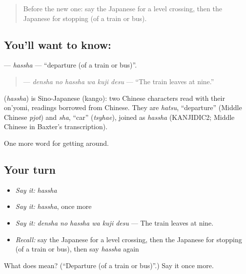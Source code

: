 \begin{quote}
Before the new one: say the Japanese for a level crossing, then the Japanese for stopping (of a train or bus).
\end{quote}

\subsection*{You'll want to know: }
\textbf{} — \emph{hassha} — \textquotedblleft{}departure (of a train or bus)\textquotedblright{}.

\begin{quote}
\textbf{  } — \emph{densha no hassha wa kuji desu} — \textquotedblleft{}The train leaves at nine.\textquotedblright{}
\end{quote}

\begin{cousinweb}
\textbf{} (\emph{hassha}) is Sino-Japanese (kango): two Chinese characters read with their on'yomi, readings borrowed from Chinese. They are \emph{hatsu}, \textquotedblleft{}departure\textquotedblright{} (Middle Chinese \emph{pjot}) and \emph{sha}, \textquotedblleft{}car\textquotedblright{} (\emph{tsyhae}), joined as \emph{hassha} (KANJIDIC2; Middle Chinese in Baxter's transcription).
\end{cousinweb}

\begin{grammarlens}[title={What you've built}]
One more word for getting around.
\end{grammarlens}

\subsection*{Your turn}
\begin{itemize}
\raggedright
  \item \emph{Say it:} \emph{hassha}
  \item \emph{Say it:} \emph{hassha}, once more
  \item \emph{Say it:} \emph{densha no hassha wa kuji desu} — The train leaves at nine.
  \item \emph{Recall:} say the Japanese for a level crossing, then the Japanese for stopping (of a train or bus), then say \emph{hassha} again
\end{itemize}

\begin{tcolorbox}[breakable,colback=teal!4,colframe=teal!35!black,title={Before you move on}]
What does  mean? (\textquotedblleft{}Departure (of a train or bus)\textquotedblright{}.) Say it once more.
\end{tcolorbox}
